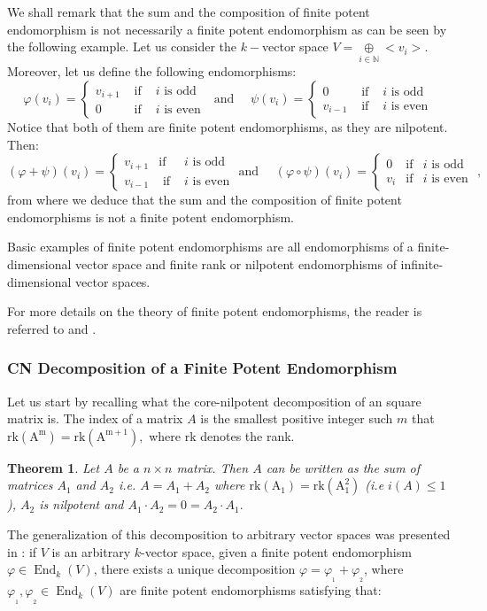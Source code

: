 \documentclass[10pt,a4paper]{amsart}
\newtheorem{thm}[defn]{Theorem}
\theoremstyle{plain}
\theoremstyle{remark}
\numberwithin{equation}{section} \numberwithin{defn}{section}
\newcommand\ed{\operatorname{End}}
\newcommand{\f}{\varphi}
\newcommand{\g}{\psi}
\newcommand{\N}{\mathbb{N}}
\begin{document}
We shall remark that the sum and the composition of finite potent endomorphism is not necessarily a finite potent endomorphism as can be seen by the following example. Let us consider the $k-$vector space  $V=\underset{i\in \N}{\oplus}<v_i>.$ Moreover, let us define the following endomorphisms:
$$\f(v_{i}) = \left \{ \begin{array}{ccl}  v_{i+1} & \text{ if } &  i \text{ is odd } \\  0 & \text{ if } & i \text{ is even } \end{array} \right . \text{ and }\quad \g(v_{i}) = \left \{ \begin{array}{ccl} 0 & \text{ if } &  i \text{ is odd }  \\   v_{i-1} & \text{ if } & i \text{ is even } \end{array} \right .$$
Notice that both of them are finite potent endomorphisms, as they are nilpotent. Then:
$$(\f+\g)(v_{i}) = \left \{ \begin{array}{ccl}  v_{i+1} & \text{if} & i\text{  is odd } \\  v_{i-1} & \text{ if } & i\text{ is even } \end{array} \right . \text {and }\quad (\f\circ \g)(v_{i}) = \left \{ \begin{array}{ccl}  0 & \text{if} & i\text{ is odd }  \\  v_i & \text{if} & i\text{ is even }  \end{array} \right .,$$ from where we deduce that the sum and the composition of finite potent endomorphisms is not a finite potent endomorphism.

Basic examples of finite potent endomorphisms are all endomorphisms of a finite-dimensional vector space and finite rank or nilpotent endomorphisms of infinite-dimensional vector spaces.

For more details on the theory of finite potent endomorphisms, the reader is referred to \cite{Pa} and \cite{Pa-CN}.

\subsubsection{CN Decomposition of a Finite Potent Endomorphism}\label{ss: CNdecomp01010101}

Let us start by recalling what the core-nilpotent decomposition of an square matrix is. The index of a matrix $A$ is the smallest positive integer such $m$ that $\mathrm{rk (A^m)}=\mathrm{rk (A^{m+1})},$ where $\mathrm{rk}$ denotes the rank.
\begin{thm}\cite[Theorem 2.2.21]{Ind}
Let $A$ be a $n\times n$ matrix. Then $A$ can be written as the sum of matrices $A_1$ and $A_2$ i.e. $A=A_1+A_2$ where $\mathrm{rk(A_1)}=\mathrm{rk(A_1^2)}$ (i.e $i(A)\leq 1$), $A_2$ is nilpotent and $A_1\cdot A_2=0=A_2\cdot A_1.$
\end{thm}
The generalization of this decomposition to arbitrary vector spaces was presented in \cite{Pa-CN}: 
if $V$ is an arbitrary $k$-vector space, given a finite potent endomorphism $\varphi \in \ed_k (V)$,  there exists a unique decomposition $\varphi = \varphi_{_1} + \varphi_{_2}$, where $\varphi_{_1}, \varphi_{_2} \in \ed_k (V)$ are finite potent endomorphisms satisfying that:
\end{document}
